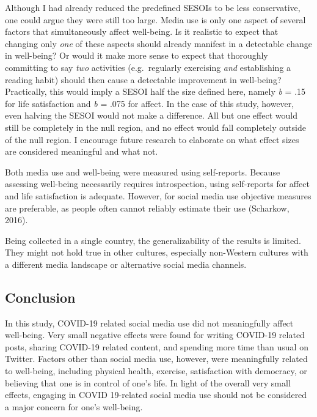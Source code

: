 \documentclass[
  man,mask,floatsintext]{apa7}
\begin{document}
Although I had already reduced the predefined SESOIs to be less conservative, one could argue they were still too large.
Media use is only one aspect of several factors that simultaneously affect well-being.
Is it realistic to expect that changing only \emph{one} of these aspects should already manifest in a detectable change in well-being?
Or would it make more sense to expect that thoroughly committing to say \emph{two} activities (e.g.~regularly exercising \emph{and} establishing a reading habit) should then cause a detectable improvement in well-being?
Practically, this would imply a SESOI half the size defined here, namely \emph{b} = \textbar.15\textbar{} for life satisfaction and \emph{b} = \textbar.075\textbar{} for affect.
In the case of this study, however, even halving the SESOI would not make a difference.
All but one effect would still be completely in the null region, and no effect would fall completely outside of the null region.
I encourage future research to elaborate on what effect sizes are considered meaningful and what not.

Both media use and well-being were measured using self-reports.
Because assessing well-being necessarily requires introspection, using self-reports for affect and life satisfaction is adequate.
However, for social media use objective measures are preferable, as people often cannot reliably estimate their use (Scharkow, 2016).

Being collected in a single country, the generalizability of the results is limited.
They might not hold true in other cultures, especially non-Western cultures with a different media landscape or alternative social media channels.

\hypertarget{conclusion}{%
\subsection{Conclusion}\label{conclusion}}

In this study, COVID-19 related social media use did not meaningfully affect well-being.
Very small negative effects were found for writing COVID-19 related posts, sharing COVID-19 related content, and spending more time than usual on Twitter.
Factors other than social media use, however, were meaningfully related to well-being, including physical health, exercise, satisfaction with democracy, or believing that one is in control of one's life.
In light of the overall very small effects, engaging in COVID 19-related social media use should not be considered a major concern for one's well-being.
\end{document}
